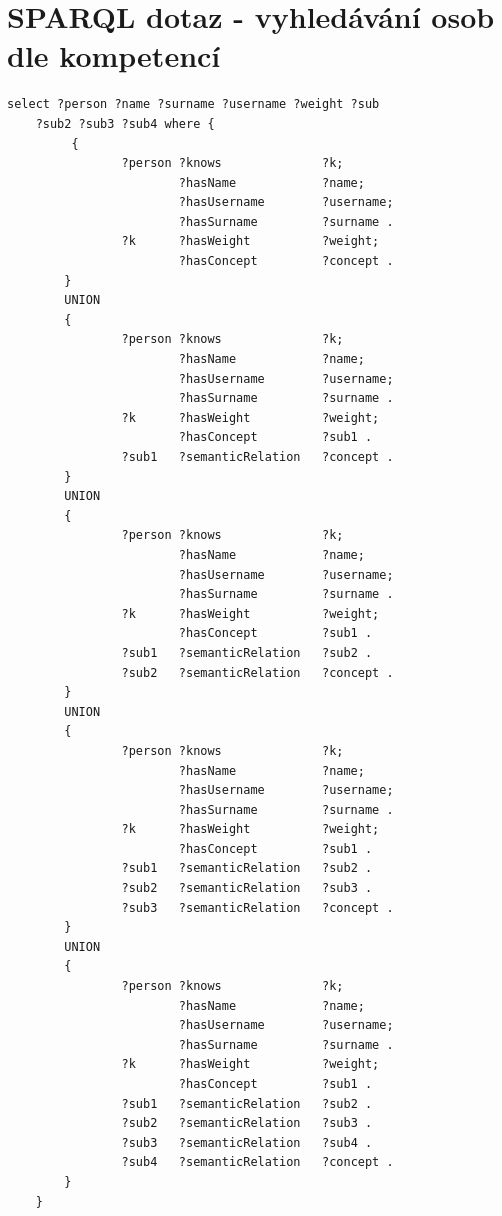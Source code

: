 \chapter{SPARQL dotaz - vyhledávání osob dle kompetencí} \label{app:sparql-query}
\begin{lstlisting}[language=SPARQL, caption= SPARQL dotaz pro vyhledávání osob dle jejich kompetencí, captionpos=b]
    select ?person ?name ?surname ?username ?weight ?sub
    ?sub2 ?sub3 ?sub4 where {
         {
                ?person ?knows              ?k;
                        ?hasName            ?name;
                        ?hasUsername        ?username;
                        ?hasSurname         ?surname .
                ?k      ?hasWeight          ?weight;
                        ?hasConcept         ?concept .
        }
        UNION
        {
                ?person ?knows              ?k;
                        ?hasName            ?name;
                        ?hasUsername        ?username;
                        ?hasSurname         ?surname .
                ?k      ?hasWeight          ?weight;
                        ?hasConcept         ?sub1 .
                ?sub1   ?semanticRelation   ?concept .
        }
        UNION
        {
                ?person ?knows              ?k;
                        ?hasName            ?name;
                        ?hasUsername        ?username;
                        ?hasSurname         ?surname .
                ?k      ?hasWeight          ?weight;
                        ?hasConcept         ?sub1 .
                ?sub1   ?semanticRelation   ?sub2 .
                ?sub2   ?semanticRelation   ?concept .
        }
        UNION
        {
                ?person ?knows              ?k;
                        ?hasName            ?name;
                        ?hasUsername        ?username;
                        ?hasSurname         ?surname .
                ?k      ?hasWeight          ?weight;
                        ?hasConcept         ?sub1 .
                ?sub1   ?semanticRelation   ?sub2 .
                ?sub2   ?semanticRelation   ?sub3 .
                ?sub3   ?semanticRelation   ?concept .
        }  
        UNION
        {
                ?person ?knows              ?k;
                        ?hasName            ?name;
                        ?hasUsername        ?username;
                        ?hasSurname         ?surname .
                ?k      ?hasWeight          ?weight;
                        ?hasConcept         ?sub1 .
                ?sub1   ?semanticRelation   ?sub2 .
                ?sub2   ?semanticRelation   ?sub3 .
                ?sub3   ?semanticRelation   ?sub4 .
                ?sub4   ?semanticRelation   ?concept .
        }   
    }
\end{lstlisting}
